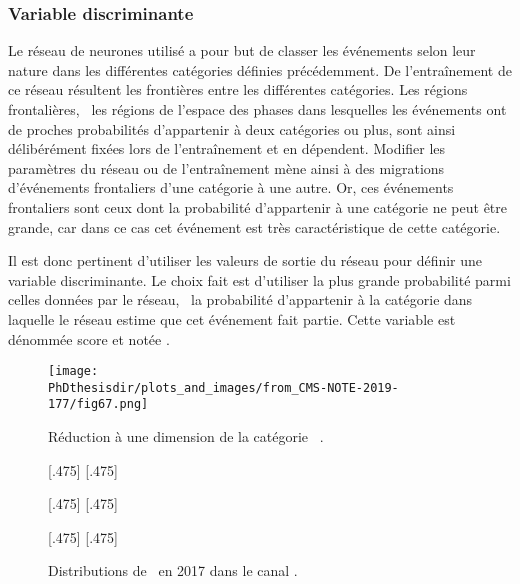 \subsubsection{Variable discriminante}
Le réseau de neurones utilisé a pour but de classer les événements selon leur nature dans les différentes catégories définies précédemment.
De l'entraînement de ce réseau résultent les frontières entre les différentes catégories.
Les régions frontalières, \ie\ les régions de l'espace des phases dans lesquelles les événements ont de proches probabilités d'appartenir à deux catégories ou plus, sont ainsi délibérément fixées lors de l'entraînement et en dépendent.
Modifier les paramètres du réseau ou de l'entraînement mène ainsi à des migrations d'événements frontaliers d'une catégorie à une autre.
Or, ces événements frontaliers sont ceux dont la probabilité d'appartenir à une catégorie ne peut être grande, car dans ce cas cet événement est très caractéristique de cette catégorie.
\par
Il est donc pertinent d'utiliser les valeurs de sortie du réseau pour définir une variable discriminante.
Le choix fait est d'utiliser la plus grande probabilité parmi celles données par le réseau, \ie\ la probabilité d'appartenir à la catégorie dans laquelle le réseau estime que cet événement fait partie.
Cette variable est dénommée \og score \fg{} et notée \NNscore.
\begin{wrapfigure}{R}{.45\textwidth}
\centering
\texttt{[image: \\PhDthesisdir/plots\_and\_images/from\_CMS-NOTE-2019-177/fig67.png]}
\caption[Réduction à une dimension de la catégorie \CATxxh.]{Réduction à une dimension de la catégorie \CATxxh~\cite{CMS-NOTE-2019-177}.}
\label{fig-67-CMS-NOTE-2019-177}
\end{wrapfigure}
\begin{figure}[p]
\centering

[.475\textwidth]
{}
\hfill
{}[.475\textwidth]
{}

[.475\textwidth]
{}
\hfill
{}[.475\textwidth]
{}

[.475\textwidth]
{}
\hfill
{}[.475\textwidth]
{}

\caption[Distributions de \NNscore\ en 2017 dans le canal \ele\mu.]{Distributions de \NNscore\ en 2017 dans le canal \ele\mu.}
\label{fig-NNscore_distribs_exemple}
\end{figure}
